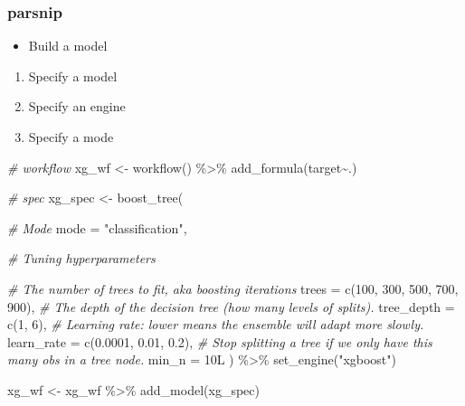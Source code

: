 \documentclass[
]{book}
\newenvironment{Shaded}{\begin{snugshade}}{\end{snugshade}}
\newcommand{\AttributeTok}[1]{\textcolor[rgb]{0.77,0.63,0.00}{#1}}
\newcommand{\CommentTok}[1]{\textcolor[rgb]{0.56,0.35,0.01}{\textit{#1}}}
\newcommand{\DecValTok}[1]{\textcolor[rgb]{0.00,0.00,0.81}{#1}}
\newcommand{\FloatTok}[1]{\textcolor[rgb]{0.00,0.00,0.81}{#1}}
\newcommand{\FunctionTok}[1]{\textcolor[rgb]{0.00,0.00,0.00}{#1}}
\newcommand{\NormalTok}[1]{#1}
\newcommand{\OtherTok}[1]{\textcolor[rgb]{0.56,0.35,0.01}{#1}}
\newcommand{\SpecialCharTok}[1]{\textcolor[rgb]{0.00,0.00,0.00}{#1}}
\newcommand{\StringTok}[1]{\textcolor[rgb]{0.31,0.60,0.02}{#1}}
\providecommand{\tightlist}{%
  \setlength{\itemsep}{0pt}\setlength{\parskip}{0pt}}
\begin{document}
\hypertarget{parsnip-3}{%
\subsubsection{parsnip}\label{parsnip-3}}

\begin{itemize}
\tightlist
\item
  Build a model
\end{itemize}

\begin{enumerate}
\def\labelenumi{\arabic{enumi}.}
\tightlist
\item
  Specify a model
\item
  Specify an engine
\item
  Specify a mode
\end{enumerate}

\begin{Shaded}
\begin{Highlighting}[]
\CommentTok{\# workflow }
\NormalTok{xg\_wf }\OtherTok{\textless{}{-}} \FunctionTok{workflow}\NormalTok{() }\SpecialCharTok{\%\textgreater{}\%} \FunctionTok{add\_formula}\NormalTok{(target}\SpecialCharTok{\textasciitilde{}}\NormalTok{.)}

\CommentTok{\# spec }
\NormalTok{xg\_spec }\OtherTok{\textless{}{-}} \FunctionTok{boost\_tree}\NormalTok{(}
  
           \CommentTok{\# Mode }
           \AttributeTok{mode =} \StringTok{"classification"}\NormalTok{,}
           
           \CommentTok{\# Tuning hyperparameters}
           
           \CommentTok{\# The number of trees to fit, aka boosting iterations}
           \AttributeTok{trees =} \FunctionTok{c}\NormalTok{(}\DecValTok{100}\NormalTok{, }\DecValTok{300}\NormalTok{, }\DecValTok{500}\NormalTok{, }\DecValTok{700}\NormalTok{, }\DecValTok{900}\NormalTok{),}
           \CommentTok{\# The depth of the decision tree (how many levels of splits).}
             \AttributeTok{tree\_depth =} \FunctionTok{c}\NormalTok{(}\DecValTok{1}\NormalTok{, }\DecValTok{6}\NormalTok{), }
           \CommentTok{\# Learning rate: lower means the ensemble will adapt more slowly.}
           \AttributeTok{learn\_rate =} \FunctionTok{c}\NormalTok{(}\FloatTok{0.0001}\NormalTok{, }\FloatTok{0.01}\NormalTok{, }\FloatTok{0.2}\NormalTok{),}
           \CommentTok{\# Stop splitting a tree if we only have this many obs in a tree node.}
             \AttributeTok{min\_n =}\NormalTok{ 10L}
\NormalTok{          ) }\SpecialCharTok{\%\textgreater{}\%} 
  \FunctionTok{set\_engine}\NormalTok{(}\StringTok{"xgboost"}\NormalTok{) }

\NormalTok{xg\_wf }\OtherTok{\textless{}{-}}\NormalTok{ xg\_wf }\SpecialCharTok{\%\textgreater{}\%} \FunctionTok{add\_model}\NormalTok{(xg\_spec)}
\end{Highlighting}
\end{Shaded}
\end{document}
